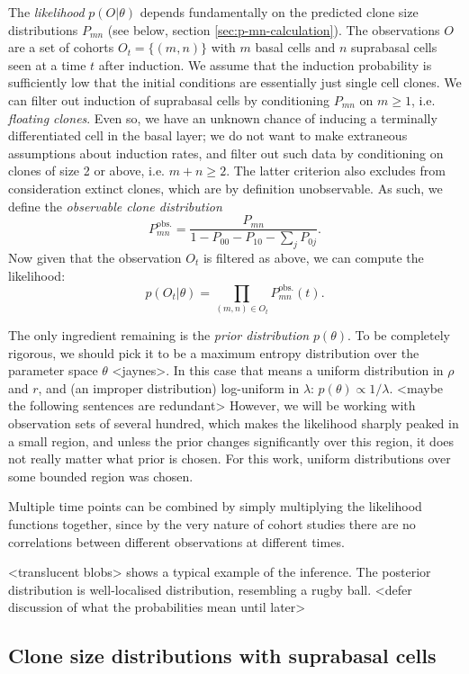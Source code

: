 \documentclass[10pt,UKenglish]{article}
\begin{document}
The \emph{likelihood} $p(O|\theta)$ depends fundamentally on the predicted clone size distributions $P_{mn}$ (see below, section \ref{sec:p-mn-calculation}). The observations $O$ are a set of cohorts $O_t = \{(m,n)\}$ with $m$ basal cells and $n$ suprabasal cells seen at a time $t$ after induction. We assume that the induction probability is sufficiently low that the initial conditions are essentially just single cell clones. We can filter out induction of suprabasal cells by conditioning $P_{mn}$ on $m \ge 1$, i.e. \emph{floating clones}. Even so, we have an unknown chance of inducing a terminally differentiated cell in the basal layer; we do not want to make extraneous assumptions about induction rates, and filter out such data by conditioning on clones of size 2 or above, i.e. $m+n \ge 2$. The latter criterion also excludes from consideration extinct clones, which are by definition unobservable. As such, we define the \emph{observable clone distribution} $$P^\textrm{obs.}_{mn} = \frac{P_{mn}}{1 - P_{00} - P_{10} - \sum_j P_{0j}}.$$ Now given that the observation $O_t$ is filtered as above, we can compute the likelihood: $$p(O_t|\theta) = \prod_{(m,n) \in O_t} P^\textrm{obs.}_{mn}(t).$$

The only ingredient remaining is the \emph{prior distribution} $p(\theta)$. To be completely rigorous, we should pick it to be a maximum entropy distribution over the parameter space $\theta$ <jaynes>. In this case that means a uniform distribution in $\rho$ and $r$, and (an improper distribution) log-uniform in $\lambda$: $p(\theta) \propto 1/\lambda$. <maybe the following sentences are redundant> However, we will be working with observation sets of several hundred, which makes the likelihood sharply peaked in a small region, and unless the prior changes significantly over this region, it does not really matter what prior is chosen. For this work, uniform distributions over some bounded region was chosen.

Multiple time points can be combined by simply multiplying the likelihood functions together, since by the very nature of cohort studies there are no correlations between different observations at different times.

<translucent blobs> shows a typical example of the inference. The posterior distribution is well-localised distribution, resembling a rugby ball. <defer discussion of what the probabilities mean until later>

\subsection{\label{sec:p-mn-calculation}Clone size distributions with suprabasal cells}
\end{document}

